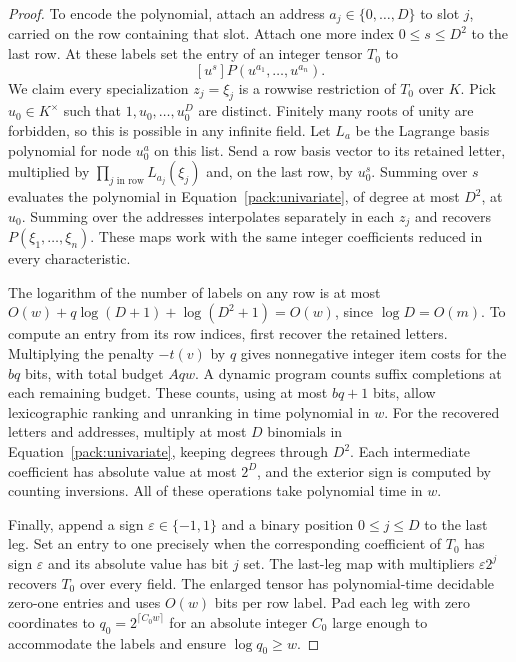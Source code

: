 \begin{proof}
To encode the polynomial, attach an address $a_j\in\{0,\ldots,D\}$ to
slot $j$, carried on the row containing that slot. Attach one more
index $0\le s\le D^2$ to the last row. At these labels set the entry
of an integer tensor $T_0$ to
\begin{equation}\label{pack:univariate}
       [u^s]P(u^{a_1},\ldots,u^{a_n}).
\end{equation}
We claim every specialization $z_j=\xi_j$ is a rowwise restriction
of $T_0$ over $K$. Pick $u_0\in K^\times$ such that
$1,u_0,\ldots,u_0^D$ are distinct. Finitely many roots of unity are
forbidden, so this is possible in any infinite field. Let $L_a$ be
the Lagrange basis polynomial for node $u_0^a$ on this list. Send a
row basis vector to its retained letter, multiplied by
$\prod_{j\text{ in row}} L_{a_j}(\xi_j)$ and, on the last row, by
$u_0^s$. Summing over $s$ evaluates the polynomial in
Equation~\eqref{pack:univariate}, of degree at most $D^2$, at $u_0$.
Summing over the addresses interpolates separately in each $z_j$ and
recovers $P(\xi_1,\ldots,\xi_n)$. These maps work with the same
integer coefficients reduced in every characteristic.

The logarithm of the number of labels on any row is at most
$O(w)+q\log(D+1)+\log(D^2+1)=O(w)$, since $\log D=O(m)$. To compute
an entry from its row indices, first recover the retained letters.
Multiplying the penalty $-t(v)$ by $q$ gives nonnegative integer item
costs for the $bq$ bits, with total budget $Aqw$. A dynamic program
counts suffix completions at each remaining budget. These counts,
using at most $bq+1$ bits, allow lexicographic ranking and unranking
in time polynomial in $w$. For the recovered letters and addresses,
multiply at most $D$ binomials in Equation~\eqref{pack:univariate},
keeping degrees through $D^2$. Each intermediate coefficient has
absolute value at most $2^D$, and the exterior sign is computed by
counting inversions. All of these operations take polynomial time in
$w$.

Finally, append a sign $\varepsilon\in\{-1,1\}$ and a binary position
$0\le j\le D$ to the last leg. Set an entry to one precisely when the
corresponding coefficient of $T_0$ has sign $\varepsilon$ and its
absolute value has bit $j$ set. The last-leg map with multipliers
$\varepsilon 2^j$ recovers $T_0$ over every field. The enlarged
tensor has polynomial-time decidable zero-one entries and uses
$O(w)$ bits per row label. Pad each leg with zero coordinates to
$q_0=2^{\lceil C_0w\rceil}$ for an absolute integer $C_0$ large enough
to accommodate the labels and ensure $\log q_0\ge w$.
\end{proof}

